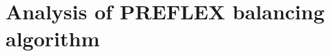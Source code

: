 \section{Analysis of PREFLEX balancing algorithm}
\begin{comment}

In this section we are going to evaluate the performance of the algorithm for different configuration parameters. 

\subsection{Algorithm modes}

PREFLEX balancing algorithm could be configured according to the approach that we want to implement. This is done by setting a coefficient for each mode. $\beta_{E}$, $\beta_{C}$ and $\beta_{L}$ denotes the positive factors associated consecutively with Equalization $E$,  Conservative $C$, and Loss Driven$L$ modes.


\begin{figure}[h]
\begin{center}

\epsfig{file=img/eps/rearch, width=4.5in}
\caption{

Network Topology.
   \label{fig:topo332}
}
\end{center}
\end{figure}

\subparagraph{Simulation scenario} Figure \ref{fig:topo332} shows the topology used for the simulations, and figure \ref{fig:flowA} shows how traffic evolve. During the scenario a failure happens between 600sec and 650 sec and E2 can't be reach through Link 1.

\begin{figure}[h!]
\begin{center}

\epsfig{file=img/flowAlt, width=4.5in}
\caption{

Flow Numbers.

   \label{fig:flowA}
}
\end{center}
\end{figure}

\clearpage

{\bf Conservative mode} : $\beta_{E}=0$, $\beta_{C}=1$ and $\beta_{L}=0$
\\The conservative mode doesn't achieve an accurate congestion balancing over the available paths (figure \ref{fig:splitCon-loss}). But more importantly, the split as desired by the balancer in this mode is not stable(figure \ref{fig:splitCon-fwnd}). Thus, it can't be used to stabilize the performance of the balancer. A plausible explanation is the  limitation of the assumption that the flow fraction is equal to byte fraction, when the loss rates of paths aren't equivalent.


\end{comment}
